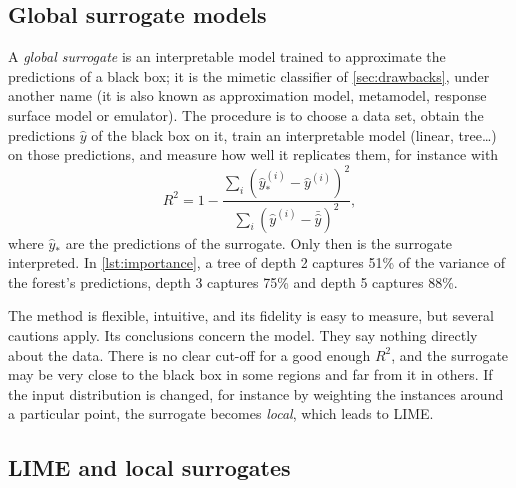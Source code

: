 \subsection{Global surrogate models}

A \emph{global surrogate} is an interpretable model trained to approximate the predictions of a
black box; it is the mimetic classifier of \cref{sec:drawbacks}, under another name (it is also known
as approximation model, metamodel, response surface model or emulator). The procedure is to choose a
data set, obtain the predictions $\hat y$ of the black box on it, train an interpretable model
(linear, tree\dots) on those predictions, and measure how well it replicates them, for instance with
\begin{equation}
  R^2=1-\frac{\sum_i(\hat y_*^{(i)}-\hat y^{(i)})^2}{\sum_i(\hat y^{(i)}-\bar{\hat y})^2},
\end{equation}
where $\hat y_*$ are the predictions of the surrogate. Only then is the surrogate interpreted. In
\cref{lst:importance}, a tree of depth 2 captures 51\% of the variance of the forest's predictions,
depth 3 captures 75\% and depth 5 captures 88\%.

The method is flexible, intuitive, and its fidelity is easy to measure, but several cautions apply.
Its conclusions concern the model. They say nothing directly about the data. There is no clear cut-off for a good
enough $R^2$, and the surrogate may be very close to the black box in some regions and far from it in
others. If the input distribution is changed, for instance by weighting the instances around a
particular point, the surrogate becomes \emph{local}, which leads to LIME.

\subsection{LIME and local surrogates}

